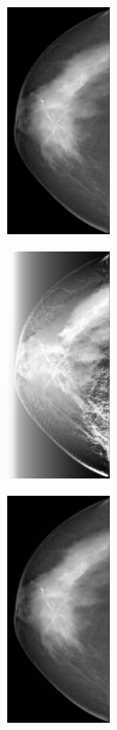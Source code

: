 \documentclass[spanish,twocolumn]{article}
\begin{document}
{\begin{minipage}[b]{1.0\linewidth}
   \begin{minipage}[t]{0.3\linewidth}  
   		\centering
        \includegraphics[width=3cm]{Figures/entropia_normal_ltg/imagen6.png}
  	\end{minipage}
  \hspace{1pt}
   \begin{minipage}[t]{0.3\linewidth}  
   		\centering
        \includegraphics[width=3cm]{Figures/entropia_normal_ltg/imagen6_2_19_1.png}
  	\end{minipage}
   \begin{minipage}[t]{0.3\linewidth}  
   		\centering
        \includegraphics[width=3cm]{Figures/entropia_normal_ltg/imagen6_2_18_0.png}
  	\end{minipage}
  \vspace{0.5cm}
    \label{fig:resultado7}


\end{minipage}}
\end{document}

